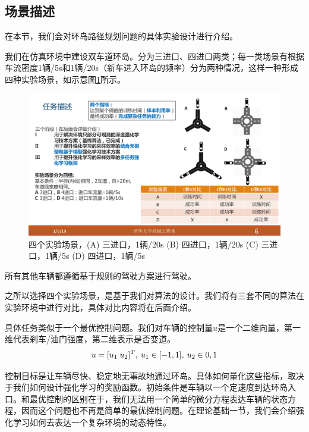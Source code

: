 \documentclass[degree=bachelor, tocarialchapter, pifootnote]{thuthesis}
\begin{document}
  \subsection{场景描述}
    在本节，我们会对环岛路径规划问题的具体实验设计进行介绍。\par
    我们在仿真环境中建设双车道环岛。分为三进口、四进口两类；每一类场景有根据车流密度1辆/5s和1辆/20s（新车进入环岛的频率）分为两种情况，这样一种形成四种实验场景，如示意图\ref{fig:experiments}所示。
      \begin{figure}[H] %
        \centering
        \includegraphics[scale=0.4]{experiments_design}
        \caption{四个实验场景，(A) 三进口，1辆/20s (B) 四进口，1辆/20s (C) 三进口，1辆/5s (D) 四进口，1辆/5s}
        \label{fig:experiments}
      \end{figure}
    \par 所有其他车辆都遵循基于规则的驾驶方案进行驾驶。
    \par 之所以选择四个实验场景，是基于我们对算法的设计。我们将有三套不同的算法在实验环境中进行对比，具体对比内容将在后面介绍。
    \par 具体任务类似于一个最优控制问题。我们对车辆的控制量$u$是一个二维向量，第一维代表刹车/油门强度，第二维表示是否变道。
    $$ u = [u_1\; u_2]^T,\: \space u_1 \in [-1, 1],\: \space u_2 \in {0, 1} $$
    \par 控制目标是让车辆尽快、稳定地无事故地通过环岛。具体如何量化这些指标，取决于我们如何设计强化学习的奖励函数。初始条件是车辆以一个定速度到达环岛入口。和最优控制的区别在于，我们无法用一个简单的微分方程表达车辆的状态方程，因而这个问题也不再是简单的最优控制问题。在理论基础一节，我们会介绍强化学习如何去表达一个复杂环境的动态特性。
\end{document}
